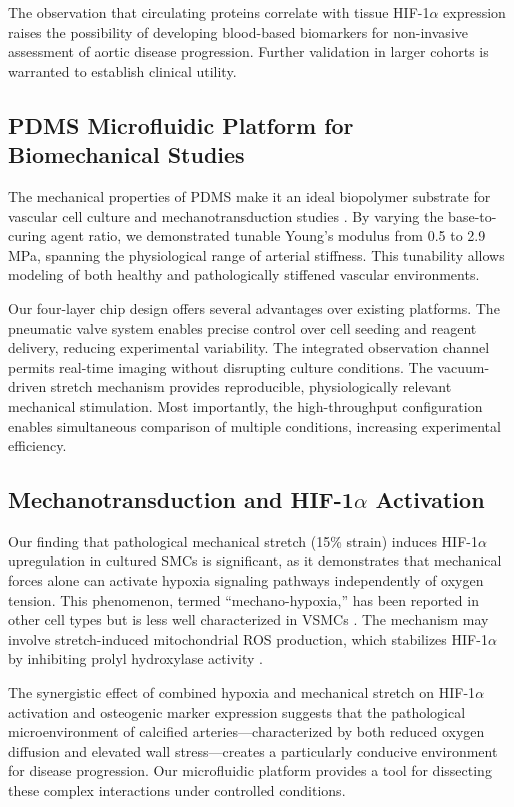 \documentclass[materials,article,submit,moreauthors,pdftex]{Definitions/mdpi}
\begin{document}
The observation that circulating proteins correlate with tissue HIF-1$\alpha$ expression raises the possibility of developing blood-based biomarkers for non-invasive assessment of aortic disease progression. Further validation in larger cohorts is warranted to establish clinical utility.

\subsection{PDMS Microfluidic Platform for Biomechanical Studies}

The mechanical properties of PDMS make it an ideal biopolymer substrate for vascular cell culture and mechanotransduction studies \cite{palchesko2012development}. By varying the base-to-curing agent ratio, we demonstrated tunable Young's modulus from 0.5 to 2.9 MPa, spanning the physiological range of arterial stiffness. This tunability allows modeling of both healthy and pathologically stiffened vascular environments.

Our four-layer chip design offers several advantages over existing platforms. The pneumatic valve system enables precise control over cell seeding and reagent delivery, reducing experimental variability. The integrated observation channel permits real-time imaging without disrupting culture conditions. The vacuum-driven stretch mechanism provides reproducible, physiologically relevant mechanical stimulation. Most importantly, the high-throughput configuration enables simultaneous comparison of multiple conditions, increasing experimental efficiency.

\subsection{Mechanotransduction and HIF-1$\alpha$ Activation}

Our finding that pathological mechanical stretch (15\% strain) induces HIF-1$\alpha$ upregulation in cultured SMCs is significant, as it demonstrates that mechanical forces alone can activate hypoxia signaling pathways independently of oxygen tension. This phenomenon, termed ``mechano-hypoxia,'' has been reported in other cell types but is less well characterized in VSMCs \cite{milkiewicz2007inhibition}. The mechanism may involve stretch-induced mitochondrial ROS production, which stabilizes HIF-1$\alpha$ by inhibiting prolyl hydroxylase activity \cite{gorlach2001thrombin}.

The synergistic effect of combined hypoxia and mechanical stretch on HIF-1$\alpha$ activation and osteogenic marker expression suggests that the pathological microenvironment of calcified arteries—characterized by both reduced oxygen diffusion and elevated wall stress—creates a particularly conducive environment for disease progression. Our microfluidic platform provides a tool for dissecting these complex interactions under controlled conditions.
\end{document}
